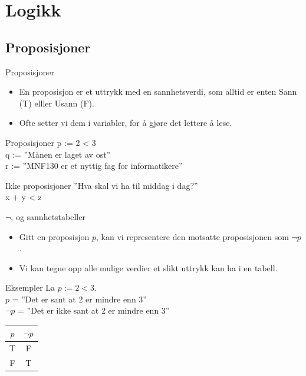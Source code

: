 \section{Logikk}
\subsection{Proposisjoner}
\begin{frame}{Proposisjoner}
\begin{itemize}
    \item En proposisjon er et uttrykk med en sannhetsverdi, som alltid er enten Sann (T) elller Usann (F).
    \item Ofte setter vi dem i variabler, for å gjøre det lettere å lese.
\end{itemize}
\pause
\begin{block}{Proposisjoner}
    p := 2 < 3 \\
    q := ''Månen er laget av ost''\\
    r := ''MNF130 er et nyttig fag for informatikere''
\end{block}
\pause
\begin{block}{Ikke proposisjoner}
    ''Hva skal vi ha til middag i dag?''\\
    x + y < z
\end{block}
\end{frame}

\begin{frame}{$\lnot$, og sannhetstabeller}
\begin{itemize}
    \item Gitt en proposisjon $p$, kan vi representere den motsatte proposisjonen som $\lnot p$.
    \item Vi kan tegne opp alle mulige verdier et slikt uttrykk kan ha i en tabell.
\end{itemize}
\pause

\begin{block}{Eksempler}
    La $p := 2 < 3$. \\
    $p$ = ''Det er sant at 2 er mindre enn 3'' \\
    $\lnot p$ = ''Det er ikke sant at 2 er mindre enn 3''
\end{block}
\pause
\begin{tabular}{c|c}
$p$ & $\lnot p$ \\ \hline
T & F \\
F & T \\ \hline
\end{tabular}
\end{frame}

